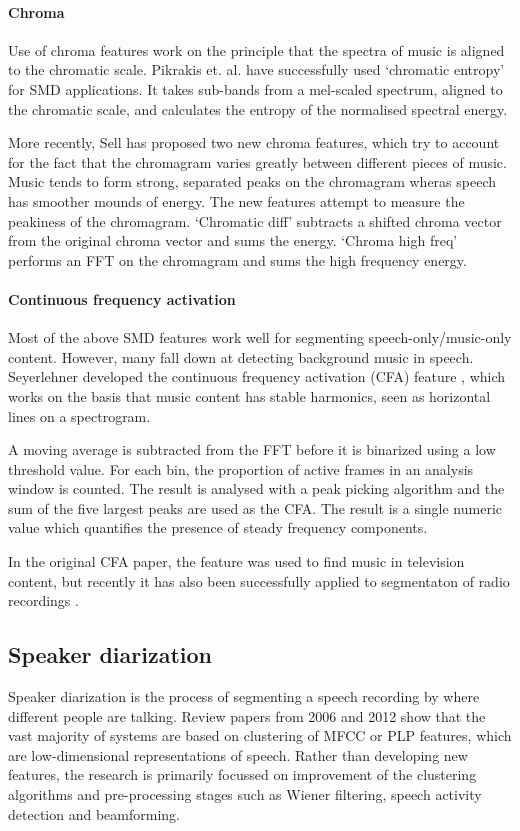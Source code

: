 \paragraph{Chroma}
Use of chroma features work on the principle that the spectra of music is
aligned to the chromatic scale. Pikrakis et. al.
\cite{Pikrakis2006,Pikrakis2008} have successfully used `chromatic entropy' for
SMD applications. It takes sub-bands from a mel-scaled spectrum, aligned to the
chromatic scale, and calculates the entropy of the normalised spectral energy.

More recently, Sell \cite{Sell2014} has proposed two new chroma features, which
try to account for the fact that the chromagram varies greatly between
different pieces of music. Music tends to form strong, separated peaks on the
chromagram wheras speech has smoother mounds of energy. The new features
attempt to measure the peakiness of the chromagram. `Chromatic diff' subtracts
a shifted chroma vector from the original chroma vector and sums the energy. 
`Chroma high freq' performs an FFT on the chromagram and sums the high
frequency energy.

\paragraph{Continuous frequency activation}
Most of the above SMD features work well for segmenting speech-only/music-only
content. However, many fall down at detecting background music in speech.
Seyerlehner developed the continuous frequency activation (CFA) feature
\cite{Seyerlehner2007}, which works on the basis that music content has stable
harmonics, seen as horizontal lines on a spectrogram.

A moving average is subtracted from the FFT before it is binarized using a low
threshold value. For each bin, the proportion of active frames in an analysis
window is counted. The result is analysed with a peak picking algorithm and the
sum of the five largest peaks are used as the CFA. The result is a single
numeric value which quantifies the presence of steady frequency components.

In the original CFA paper, the feature was used to find music in television
content, but recently it has also been successfully applied to segmentaton of
radio recordings \cite{Wieser2014}.

\subsection{Speaker diarization}
Speaker diarization is the process of segmenting a speech recording by where
different people are talking. Review papers from 2006 \cite{Tranter2006} and
2012 \cite{AngueraMiro2012} show that the vast majority of systems are based on
clustering of MFCC or PLP features, which are low-dimensional representations
of speech. Rather than developing new features, the research is primarily
focussed on improvement of the clustering algorithms and pre-processing stages
such as Wiener filtering, speech activity detection and beamforming.

